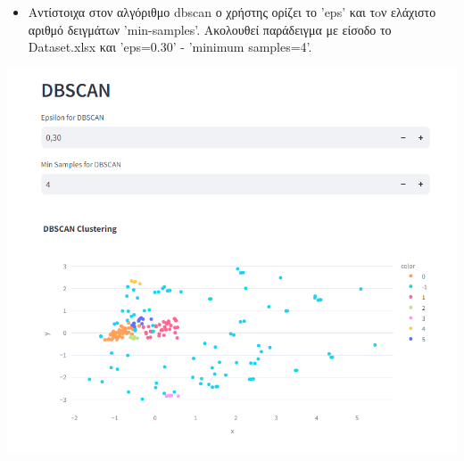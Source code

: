 \documentclass{article}
\begin{document}
\newpage
\begin{itemize}
  \item {}Αντίστοιχα στον αλγόριθμο dbscan ο χρήστης ορίζει το 'eps' και τoν ελάχιστο αριθμό δειγμάτων 'min-samples'. Ακολουθεί παράδειγμα με είσοδο το Dataset.xlsx και 'eps=0.30' - 'minimum samples=4'.
\end{itemize}

\includegraphics[width=1.0\linewidth]{tab2_dbscan.png}
\end{document}
